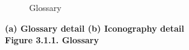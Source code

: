 \begin{figure}[ht]
    \centering
    \hfill
    \caption{Glossary}
\end{figure}




\begin{center}
\bf{(a) Glossary detail   (b) Iconography detail \\
    Figure 3.1.1. Glossary}
    \end{center}